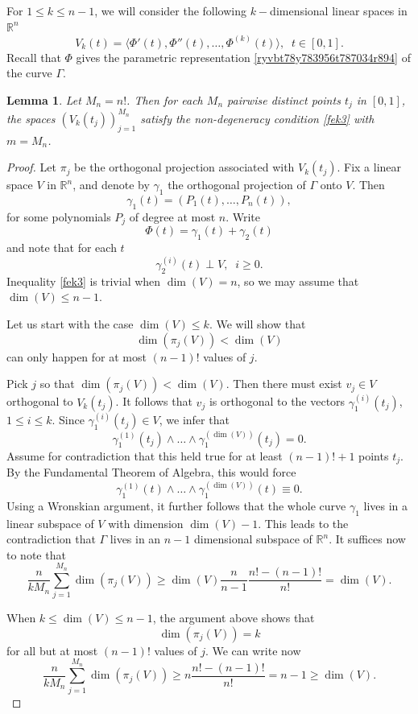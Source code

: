 \documentclass[amssymb,amsfonts,12pt]{amsart}
\newtheorem{lemma}[theorem]{Lemma}
\def\R{{\mathbb R}}
\begin{document}
For $1\le k\le n-1$, we will consider the following $k-$dimensional linear spaces  in $\R^n$
$$V_k(t)=\langle \Phi'(t),\Phi''(t),\ldots,\Phi^{(k)}(t)\rangle,\;\; t\in[0,1].$$
Recall that $\Phi$ gives the parametric representation \eqref{ryvbt78y783956t787034r894} of the curve $\Gamma$.
\begin{lemma}
\label{nl1}
Let $M_n=n!$. Then for each $M_n$ pairwise distinct  points $t_j$ in $[0,1]$, the spaces $(V_k(t_j))_{j=1}^{M_n}$ satisfy the non-degeneracy condition \eqref{fek3} with $m=M_n$.
\end{lemma}
\begin{proof}
Let $\pi_j$ be the orthogonal projection associated with $V_k(t_j)$.
Fix a linear space $V$ in $\R^n$, and denote by $\gamma_1$ the orthogonal projection of $\Gamma$ onto $V$. Then
$$\gamma_1(t)=(P_1(t),\ldots,P_n(t)),$$
for some polynomials $P_j$ of degree at most $n$. Write
$$\Phi(t)=\gamma_1(t)+\gamma_2(t)$$
and note that for each $t$ $$\gamma_2^{(i)}(t)\perp V,\;\;i\ge 0.$$
Inequality \eqref{fek3} is trivial when $\dim(V)=n$, so we may assume that $\dim(V)\le n-1$.

Let us start with the case $\dim(V)\le k$. We will show that
$$\dim(\pi_j(V))<\dim(V)$$
can only happen for at most $(n-1)!$ values of $j$.

Pick $j$ so that $\dim(\pi_j(V))<\dim(V)$. Then there must exist $v_j\in V$ orthogonal to $V_k(t_j)$. It follows that $v_j$ is orthogonal to the vectors $\gamma_1^{(i)}(t_j)$, $1\le i\le k$. Since $\gamma_1^{(i)}(t_j)\in V$, we infer that
$$\gamma_1^{(1)}(t_j)\wedge\ldots\wedge \gamma_1^{(\dim(V))}(t_j)=0.$$
Assume for contradiction that this held true for at least $(n-1)!+1$ points $t_j$. By the Fundamental Theorem of Algebra, this would force
$$\gamma_1^{(1)}(t)\wedge\ldots\wedge \gamma_1^{(\dim(V))}(t)\equiv 0.$$
Using a Wronskian argument, it further follows that the whole curve $\gamma_1$ lives in a linear subspace of $V$ with dimension $\dim(V)-1$. This leads to the contradiction that $\Gamma$ lives in an $n-1$ dimensional subspace of $\R^n$. It suffices now to note that
$$\frac{n}{kM_n}\sum_{j=1}^{M_n}{\dim(\pi_j(V))}\ge \dim(V)\frac{n}{n-1}\frac{n!-(n-1)!}{n!}=\dim(V).$$
\medskip

When $k\le \dim(V)\le n-1$, the argument above shows that
$$\dim(\pi_j(V))=k$$
for all but at most $(n-1)!$ values of $j$. We can write now
$$\frac{n}{kM_n}\sum_{j=1}^{M_n}{\dim(\pi_j(V))}\ge n\frac{n!-(n-1)!}{n!}=n-1\ge \dim(V).$$



\end{proof}
\end{document}
